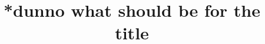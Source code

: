 \documentclass[twoside,final]{hcmut-report}
\title{*dunno what should be for the title}
\begin{document}
\coverpage%

\tableofcontents

\clearpage


\end{document}
